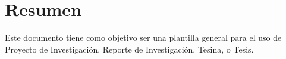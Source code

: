 \chapter*{Resumen}

Este documento tiene como objetivo ser una plantilla general para el uso de 
Proyecto de Investigación, Reporte de Investigación, Tesina, o Tesis.

